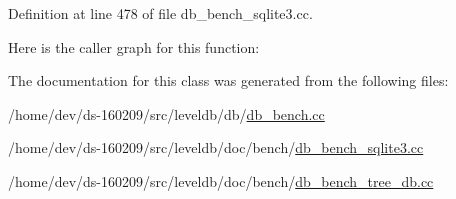 Definition at line 478 of file db\+\_\+bench\+\_\+sqlite3.\+cc.



Here is the caller graph for this function\+:




The documentation for this class was generated from the following files\+:\begin{DoxyCompactItemize}
\item 
/home/dev/ds-\/160209/src/leveldb/db/\hyperlink{db__bench_8cc}{db\+\_\+bench.\+cc}\item 
/home/dev/ds-\/160209/src/leveldb/doc/bench/\hyperlink{db__bench__sqlite3_8cc}{db\+\_\+bench\+\_\+sqlite3.\+cc}\item 
/home/dev/ds-\/160209/src/leveldb/doc/bench/\hyperlink{db__bench__tree__db_8cc}{db\+\_\+bench\+\_\+tree\+\_\+db.\+cc}\end{DoxyCompactItemize}
